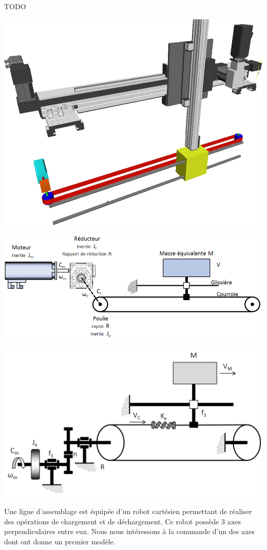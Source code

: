 \documentclass[10pt,fleqn]{article} %
\begin{document}

\vspace{10cm}
\pagestyle{fancy}
\thispagestyle{plain}


\def\columnseprulecolor{\color{ocre}}
\setlength{\columnseprule}{0.4pt} 
\ifprof
\else
\begin{multicols}{2}
\fi

\begin{obj} 
TODO
\end{obj}

\begin{center}
\includegraphics[width=.45\textwidth]{images/RobotCartesien}

\includegraphics[width=.45\textwidth]{images/chaine_01}

\includegraphics[width=.45\textwidth]{images/chaine_02}
\end{center}

Une ligne d'assemblage est équipée d'un robot cartésien permettant de réaliser des opérations de chargement et de déchargement. Ce robot possède 3 axes perpendiculaires entre eux. 
Nous nous intéressons à la commande d'un des axes dont ont donne un premier modèle.


\end{multicols}
\end{document}
